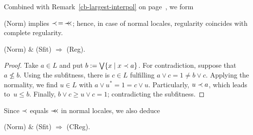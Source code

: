 Combined with Remark~\ref{cb-largest-interpol} on
page~\pageref{cb-largest-interpol}\thinspace, we form

\begin{cor}
  (Norm) implies $\prec \, = \, \prec\mkern-8mu\prec$;
  hence, in case of normal locales, regularity coincides with complete
  regularity.
\end{cor}

\begin{thm}
  (Norm) $\&$ (Sfit) $\Rightarrow$ (Reg).
\end{thm}
\begin{proof}
  Take $a\in L$ and put $b := \bigvee \{x \mid x \prec a\}$.
  For contradiction, suppose that $a\not\le b$.
  Using the subfitness, there is $c\in L$ fulfilling $a \vee c = 1 \ne b \vee
  c$.
  Applying the normality, we find $u\in L$ with $a \vee u^* = 1 = c \vee u$.
  Particularly, $u \prec a$, which leads to~$u \le b$.
  Finally, $b \vee c \ge u \vee c = 1$; contradicting the subfitness.
\end{proof}

Since $\prec$ equals $\prec\mkern-8mu\prec$ in normal locales, we also deduce

\begin{cor}
  (Norm) $\&$ (Sfit) $\Rightarrow$ (CReg).
\end{cor}
